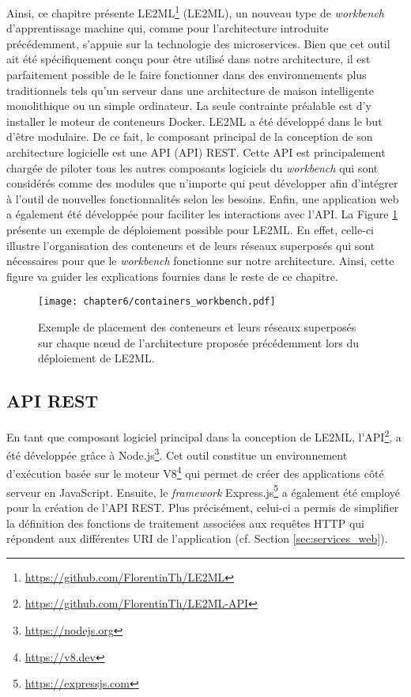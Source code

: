 Ainsi, ce chapitre présente \acs{LE2ML}\footnote{\url{https://github.com/FlorentinTh/LE2ML}} (\acl{LE2ML}), un nouveau type de \textit{workbench} d'apprentissage machine qui, comme pour l'architecture introduite précédemment, s'appuie sur la technologie des microservices. Bien que cet outil ait été spécifiquement conçu pour être utilisé dans notre architecture, il est parfaitement possible de le faire fonctionner dans des environnements plus traditionnels tels qu'un serveur dans une architecture de maison intelligente monolithique ou un simple ordinateur. La seule contrainte préalable est d'y installer le moteur de conteneurs Docker. LE2ML a été développé dans le but d'être modulaire. De ce fait, le composant principal de la conception de son architecture logicielle est une \acs{API} (\acl{API}) \acs{REST}. Cette API est principalement chargée de piloter tous les autres composants logiciels du \textit{workbench} qui sont considérés comme des modules que n'importe qui peut développer afin d'intégrer à l'outil de nouvelles fonctionnalités selon les besoins. Enfin, une application web a également été développée pour faciliter les interactions avec l'\acs{API}. La Figure \ref{fig:containers_workbench} présente un exemple de déploiement possible pour \acs{LE2ML}. En effet, celle-ci illustre l'organisation des conteneurs et de leurs réseaux superposés qui sont nécessaires pour que le \textit{workbench} fonctionne sur notre architecture. Ainsi, cette figure va guider les explications fournies dans le reste de ce chapitre.

\begin{figure}[H]
	\centering
	\texttt{[image: chapter6/containers\_workbench.pdf]}
        \caption{Exemple de placement des conteneurs et leurs réseaux superposés sur chaque n\oe{}ud de l'architecture proposée précédemment lors du déploiement de \acs{LE2ML}.}
	\label{fig:containers_workbench}
\end{figure}

\subsection{\acs{API} \acs{REST}}

En tant que composant logiciel principal dans la conception de \acs{LE2ML}, l'\acs{API}\footnote{\url{https://github.com/FlorentinTh/LE2ML-API}}, a été développée grâce à Node.js\footnote{\url{https://nodejs.org}}. Cet outil constitue un environnement d'exécution basée sur le moteur V8\footnote{\url{https://v8.dev}} qui permet de créer des applications côté serveur en JavaScript. Ensuite, le \textit{framework} Express.js\footnote{\url{https://expressjs.com}} a également été employé pour la création de l'\acs{API} \acs{REST}. Plus précisément, celui-ci a permis de simplifier la définition des fonctions de traitement associées aux requêtes \acs{HTTP} qui répondent aux différentes \acs{URI} de l'application (cf. Section \ref{sec:services_web}).

